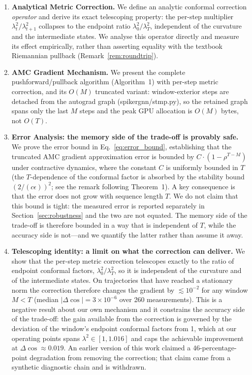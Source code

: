 \documentclass[a4paper,fleqn]{cas-dc}
\begin{document}
\begin{enumerate}
    \item \textbf{Analytical Metric Correction.} We define an analytic conformal correction \emph{operator} and derive its exact telescoping property: the per-step multiplier $\lambda_t^2/\lambda_{t+1}^2$ collapses to the endpoint ratio $\lambda_0^2/\lambda_T^2$, independent of the curvature and the intermediate states. We analyse this operator directly and measure its effect empirically, rather than asserting equality with the textbook Riemannian pullback (Remark~\ref{rem:roundtrip}).
    
    \item \textbf{AMC Gradient Mechanism.} We present the complete pushforward/pullback algorithm (Algorithm~1) with per-step metric correction, and its $O(M)$ truncated variant: window-exterior steps are detached from the autograd graph (spikergnn/stmp.py), so the retained graph spans only the last $M$ steps and the peak GPU allocation is $O(M)$ bytes, not $O(T)$.
    
    \item \textbf{Error Analysis: the memory side of the trade-off is provably safe.} We prove the error bound in Eq.~\eqref{eq:error_bound}, establishing that the truncated AMC gradient approximation error is bounded by $C \cdot (1-\rho^{T-M})$ under contractive dynamics, where the constant $C$ is uniformly bounded in $T$ (the $T$-dependence of the conformal factor is absorbed by the stability bound $(2/(c\epsilon))^2$; see the remark following Theorem~1). A key consequence is that the error does not grow with sequence length $T$. We do not claim that this bound is tight: the measured error is reported separately in Section~\ref{sec:robustness} and the two are not equated. The memory side of the trade-off is therefore bounded in a way that is independent of $T$, while the accuracy side is not---and we quantify the latter rather than assume it away.
    
    \item \textbf{Telescoping identity: a limit on what the correction can deliver.} We show that the per-step metric correction telescopes exactly to the ratio of endpoint conformal factors, $\lambda_0^2/\lambda_T^2$, so it is independent of the curvature and of the intermediate states. On trajectories that have reached a stationary norm the correction therefore changes the gradient by $\lesssim10^{-2}$ for any window $M<T$ (median $|\Delta\cos| = 3\times10^{-6}$ over 260 measurements). This is a negative result about our own mechanism and it constrains the accuracy side of the trade-off: the gain available from the correction is governed by the deviation of the window's endpoint conformal factors from 1, which at our operating points spans $\lambda^2 \in [1, 1.016]$ and caps the achievable improvement at $\Delta\cos \approx 0.019$. An earlier version of this work claimed a 46-percentage-point degradation from removing the correction; that claim came from a synthetic diagnostic chain and is withdrawn.
    

\end{enumerate}
\end{document}
